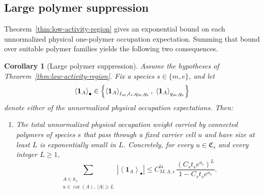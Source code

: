 \documentclass[dvipsnames,a4paper]{article}
\numberwithin{equation}{section}
\newtheorem{corollary}[theorem]{Corollary}
\theoremstyle{definition}
\theoremstyle{remark}
\begin{document}
\subsection{Large polymer suppression}
\label{sec:physical-occupation-tails}

Theorem~\ref{thm:low-activity-region} gives an exponential bound on each unnormalized physical one-polymer occupation expectation. Summing that bound over suitable polymer
families yields the following two consequences.


\begin{corollary}[Large polymer suppression]
	\label{cor:physical-occupation-tails}
	Assume the hypotheses of Theorem~\ref{thm:low-activity-region}. Fix a species
	\(s\in\{m,e\}\), and let
	\begin{equation}
		\left\langle \mathbf 1_A \right\rangle_\bullet
		\in
		\Bigl\{
		\left\langle \mathbf 1_A \right\rangle_{\ell_m,\ell_e;q_m,q_e},
		\;
		\left\langle \mathbf 1_A \right\rangle_{q_m,q_e}
		\Bigr\}
	\end{equation}
	denote either of the unnormalized physical occupation expectations. Then:
	\begin{enumerate}[label=(\roman*)]
		\item\label{corItem:large-tail}
		The total unnormalized physical occupation weight carried by connected polymers of
		species \(s\) that pass through a fixed carrier cell \(u\) and have size at least \(L\)
		is exponentially small in \(L\). Concretely, for every
		\(u\in\mathfrak C_s\) and every integer \(L\ge 1\),
		\begin{equation}
			\sum_{\substack{A\in\mathbb A_s\\
					u\in\operatorname{car}(A),\ |A|\ge L}}
			\left|
			\left\langle \mathbf 1_A \right\rangle_\bullet
			\right|
			\le
			C_{M,\underline\Lambda,s}^{\mathrm{la}}\,
			\frac{(C_s t_s e^{a_s})^L}{1-C_s t_s e^{a_s}}.
			\label{eq:physical-tail-bound}
		\end{equation}
		

\end{enumerate}
\end{corollary}
\end{document}
